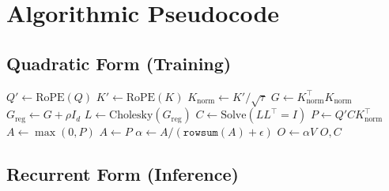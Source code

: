 \documentclass[11pt,a4paper]{article}
\theoremstyle{remark}
\begin{document}
\appendix
\section{Algorithmic Pseudocode}

\subsection{Quadratic Form (Training)}

\begin{algorithm}[h]
\caption{RhoAttn\_Quadratic($Q, K, V, \rho, \tau$, mode)}
\begin{algorithmic}[1]
\State $Q' \gets \text{RoPE}(Q)$ 
\State $K' \gets \text{RoPE}(K)$
\State $K_{\text{norm}} \gets K' / \sqrt{\tau}$ 
\State $G \gets K_{\text{norm}}^\top K_{\text{norm}}$ 
\State $G_{\text{reg}} \gets G + \rho I_d$ 
\State $L \gets \text{Cholesky}(G_{\text{reg}})$ 
\State $C \gets \text{Solve}(L L^\top = I)$ 
\State $P \gets Q' C K_{\text{norm}}^\top$ 
    \State $A \gets \max(0, P)$ 
\Else
    \State $A \gets P$ 
\EndIf
\State $\alpha \gets A / (\texttt{rowsum}(A) + \epsilon)$ 
\State $O \gets \alpha V$ 
\State \Return $O, C$ 
\end{algorithmic}
\end{algorithm}

\subsection{Recurrent Form (Inference)}
\end{document}
